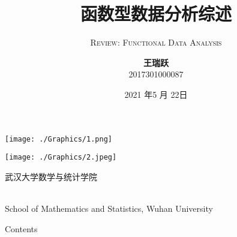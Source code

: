\documentclass[aspectratio=169, 9pt]{beamer}
\author[王瑞跃 \quad \quad 2017301000087 ]{\textbf{王瑞跃} \\ 2017301000087 }
\title{\textbf{函数型数据分析综述}}
\subtitle{\textsc{Review: Functional Data Analysis}} %
\institute[CUI] %
{
    {\small \textbf{指导老师}} \\ \vspace{0.5mm} {\normalsize \textbf{丁洁丽} \quad \textbf{副教授}} \vspace{5mm}
}
\date{2021 年5 月 22日}
\begin{document}
\songti


\begin{frame}[plain]
    \begin{center}
            \begin{minipage}[c]{0.12\linewidth}
                    \begin{center}
                    \texttt{[image: ./Graphics/1.png]} 
                    \end{center}
            \end{minipage}
            \begin{minipage}[c]{0.12\linewidth}
                    \begin{center}
                    \texttt{[image: ./Graphics/2.jpeg]} 
                    \end{center}
            \end{minipage}
            \begin{minipage}[c]{0.55\linewidth}
                    \begin{center}
                    \begin{large}
                     武汉大学数学与统计学院
                    \end{large} 
                    \begin{small}
                    \\ \vspace{2mm} School of Mathematics and Statistics, Wuhan University
                    \end{small}
                    \end{center}
            \end{minipage}
    \end{center}
\titlepage 
\end{frame}


\begingroup 
    \begin{frame}{Contents}
        \tableofcontents{}
    \end{frame}
\endgroup

\end{document}
